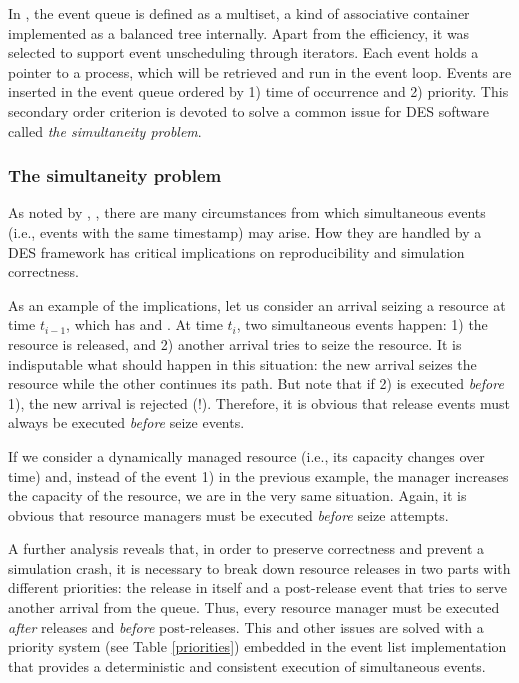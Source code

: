 \documentclass[
  nojss]{jss}
\begin{document}
In , the event queue is defined as a 
multiset, a kind of associative container implemented as a balanced tree
internally. Apart from the efficiency, it was selected to support event
unscheduling through iterators. Each event holds a pointer to a process,
which will be retrieved and run in the event loop. Events are inserted
in the event queue ordered by 1) time of occurrence and 2) priority.
This secondary order criterion is devoted to solve a common issue for
DES software called \emph{the simultaneity problem}.

\subsubsection{The simultaneity problem}\label{the-simultaneity-problem}

As noted by \citet{Ronngren:1999:EOP:301429.301456},
\citet{Jha:2000:SEL:361026.361032}, there are many circumstances from
which simultaneous events (i.e., events with the same timestamp) may
arise. How they are handled by a DES framework has critical implications
on reproducibility and simulation correctness.

As an example of the implications, let us consider an arrival seizing a
resource at time \(t_{i-1}\), which has  and
. At time \(t_{i}\), two simultaneous events happen:
1) the resource is released, and 2) another arrival tries to seize the
resource. It is indisputable what should happen in this situation: the
new arrival seizes the resource while the other continues its path. But
note that if 2) is executed \emph{before} 1), the new arrival is
rejected (!). Therefore, it is obvious that release events must always
be executed \emph{before} seize events.

If we consider a dynamically managed resource (i.e., its capacity
changes over time) and, instead of the event 1) in the previous example,
the manager increases the capacity of the resource, we are in the very
same situation. Again, it is obvious that resource managers must be
executed \emph{before} seize attempts.

A further analysis reveals that, in order to preserve correctness and
prevent a simulation crash, it is necessary to break down resource
releases in two parts with different priorities: the release in itself
and a post-release event that tries to serve another arrival from the
queue. Thus, every resource manager must be executed \emph{after}
releases and \emph{before} post-releases. This and other issues are
solved with a priority system (see Table \ref{priorities}) embedded in
the event list implementation that provides a deterministic and
consistent execution of simultaneous events.
\end{document}
